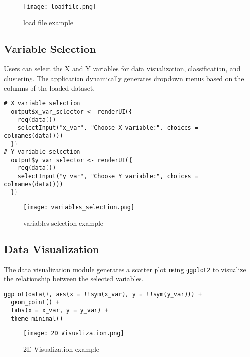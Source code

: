 \documentclass{article}
\begin{document}
\begin{figure}
    \centering
    \texttt{[image: loadfile.png]}
    \caption{load file example}
    \label{fig:Data Loading}
\end{figure}

\FloatBarrier %

\subsection{Variable Selection}
Users can select the X and Y variables for data visualization, classification, and clustering. The application dynamically generates dropdown menus based on the columns of the loaded dataset.

\begin{verbatim}
# X variable selection
  output$x_var_selector <- renderUI({
    req(data())
    selectInput("x_var", "Choose X variable:", choices = colnames(data()))
  })  
# Y variable selection
  output$y_var_selector <- renderUI({
    req(data())
    selectInput("y_var", "Choose Y variable:", choices = colnames(data()))
  })
\end{verbatim}

\begin{figure}
    \centering
    \texttt{[image: variables\_selection.png]}
    \caption{variables selection example}
    \label{fig:Variable Selection}
\end{figure}

\FloatBarrier %

\subsection{Data Visualization}
The data visualization module generates a scatter plot using \texttt{ggplot2} to visualize the relationship between the selected variables.

\begin{verbatim}
ggplot(data(), aes(x = !!sym(x_var), y = !!sym(y_var))) +
  geom_point() +
  labs(x = x_var, y = y_var) +
  theme_minimal()
\end{verbatim}

\begin{figure}
    \centering
    \texttt{[image: 2D Visualization.png]}
    \caption{2D Visualization example}
    \label{fig:Data Visualization}
\end{figure}
\FloatBarrier
\end{document}

